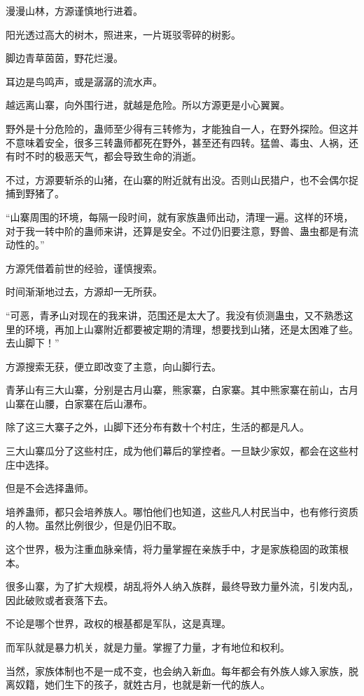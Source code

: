 
\begin{this_body}

漫漫山林，方源谨慎地行进着。

阳光透过高大的树木，照进来，一片斑驳零碎的树影。

脚边青草茵茵，野花烂漫。

耳边是鸟鸣声，或是潺潺的流水声。

越远离山寨，向外围行进，就越是危险。所以方源更是小心翼翼。

野外是十分危险的，蛊师至少得有三转修为，才能独自一人，在野外探险。但这并不意味着安全，很多三转蛊师都死在野外，甚至还有四转。猛兽、毒虫、人祸，还有时不时的极恶天气，都会导致生命的消逝。

不过，方源要斩杀的山猪，在山寨的附近就有出没。否则山民猎户，也不会偶尔捉捕到野猪了。

“山寨周围的环境，每隔一段时间，就有家族蛊师出动，清理一遍。这样的环境，对于我一转中阶的蛊师来讲，还算是安全。不过仍旧要注意，野兽、蛊虫都是有流动性的。”

方源凭借着前世的经验，谨慎搜索。

时间渐渐地过去，方源却一无所获。

“可恶，青矛山对现在的我来讲，范围还是太大了。我没有侦测蛊虫，又不熟悉这里的环境，再加上山寨附近都要被定期的清理，想要找到山猪，还是太困难了些。去山脚下！”

方源搜索无获，便立即改变了主意，向山脚行去。

青茅山有三大山寨，分别是古月山寨，熊家寨，白家寨。其中熊家寨在前山，古月山寨在山腰，白家寨在后山瀑布。

除了这三大寨子之外，山脚下还分布有数十个村庄，生活的都是凡人。

三大山寨瓜分了这些村庄，成为他们幕后的掌控者。一旦缺少家奴，都会在这些村庄中选择。

但是不会选择蛊师。

培养蛊师，都只会培养族人。哪怕他们也知道，这些凡人村民当中，也有修行资质的人物。虽然比例很少，但是仍旧不取。

这个世界，极为注重血脉亲情，将力量掌握在亲族手中，才是家族稳固的政策根本。

很多山寨，为了扩大规模，胡乱将外人纳入族群，最终导致力量外流，引发内乱，因此破败或者衰落下去。

不论是哪个世界，政权的根基都是军队，这是真理。

而军队就是暴力机关，就是力量。掌握了力量，才有地位和权利。

当然，家族体制也不是一成不变，也会纳入新血。每年都会有外族人嫁入家族，脱离奴籍，她们生下的孩子，就姓古月，也就是新一代的族人。


\end{this_body}
